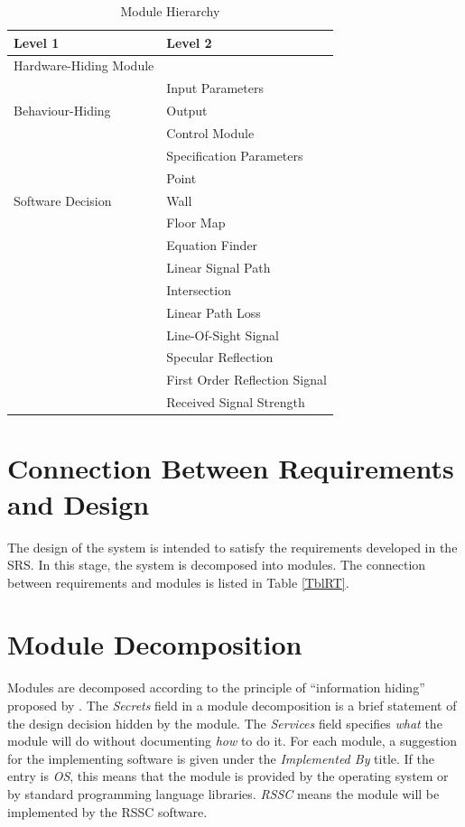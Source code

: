 \documentclass[12pt, titlepage]{article}
\begin{document}
\begin{table}[h!]
\centering
\begin{tabular}{p{} p{}}
\toprule
\textbf{Level 1} & \textbf{Level 2}\\
\midrule

{Hardware-Hiding Module} & ~ \\
\midrule

\multirow{3}{0.3\textwidth}{Behaviour-Hiding} & Input Parameters\\
& Output\\
& Control Module\\
& Specification Parameters\\
\midrule

\multirow{3}{0.3\textwidth}{Software Decision} & Point\\
& Wall\\
& Floor Map\\
& Equation Finder\\
& Linear Signal Path\\
& Intersection\\
& Linear Path Loss\\
& Line-Of-Sight Signal\\
& Specular Reflection\\
& First Order Reflection Signal\\
& Received Signal Strength\\
\bottomrule

\end{tabular}
\caption{Module Hierarchy}
\label{TblMH}
\end{table}

\section{Connection Between Requirements and Design} \label{SecConnection}

The design of the system is intended to satisfy the requirements developed in
the SRS. In this stage, the system is decomposed into modules. The connection
between requirements and modules is listed in Table \ref{TblRT}.

\section{Module Decomposition} \label{SecMD}

Modules are decomposed according to the principle of ``information hiding''
proposed by \citet{ParnasEtAl1984}. The \emph{Secrets} field in a module
decomposition is a brief statement of the design decision hidden by the
module. The \emph{Services} field specifies \emph{what} the module will do
without documenting \emph{how} to do it. For each module, a suggestion for the
implementing software is given under the \emph{Implemented By} title. If the
entry is \emph{OS}, this means that the module is provided by the operating
system or by standard programming language libraries.  \emph{RSSC} means the
module will be implemented by the RSSC software.
\end{document}
